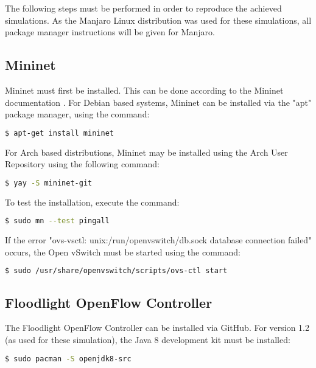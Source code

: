 The following steps must be performed in order to reproduce the achieved
simulations. As the Manjaro Linux distribution was used for these simulations,
all package manager instructions will be given for Manjaro.

\subsection{Mininet}

Mininet must first be installed. This can be done according to the Mininet
documentation \cite{mininetWS}. For Debian based systems, Mininet can be installed via the
"apt" package manager, using the command:

\begin{lstlisting}[language=bash, caption=Debian-based Distro Mininet Install]
$ apt-get install mininet
\end{lstlisting}

For Arch based distributions, Mininet may be installed using the Arch User
Repository using the following command:

\begin{lstlisting}[language=bash, caption=Arch-based Distro Mininet Install]
$ yay -S mininet-git
\end{lstlisting}

To test the installation, execute the command:

\begin{lstlisting}[language=bash, caption=Mininet installation test]
$ sudo mn --test pingall
\end{lstlisting}

If the error "ovs-vsctl: unix:/run/openvswitch/db.sock database connection
failed" occurs, the Open vSwitch must be started using the command:

\begin{lstlisting}[language=bash, caption=Open vSwitch service start command]
$ sudo /usr/share/openvswitch/scripts/ovs-ctl start
\end{lstlisting}

\subsection{Floodlight OpenFlow Controller}

The Floodlight OpenFlow Controller can be installed via GitHub\cite{floodlight}.
For version 1.2 (as used for these simulation), the Java 8 development kit must
be installed:

\begin{lstlisting}[language=bash, caption=openjdk8 installation]
$ sudo pacman -S openjdk8-src
\end{lstlisting}

